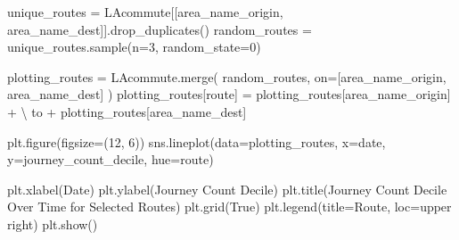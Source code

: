 \documentclass[
  number]{elsarticle}
\newenvironment{Shaded}{\begin{snugshade}}{\end{snugshade}}
\newcommand{\DecValTok}[1]{\textcolor[rgb]{0.68,0.00,0.00}{#1}}
\newcommand{\NormalTok}[1]{\textcolor[rgb]{0.00,0.23,0.31}{#1}}
\newcommand{\OperatorTok}[1]{\textcolor[rgb]{0.37,0.37,0.37}{#1}}
\newcommand{\StringTok}[1]{\textcolor[rgb]{0.13,0.47,0.30}{#1}}
\newcommand{\VariableTok}[1]{\textcolor[rgb]{0.07,0.07,0.07}{#1}}
\begin{document}
\begin{Shaded}
\begin{Highlighting}[]
\NormalTok{unique\_routes }\OperatorTok{=}\NormalTok{ LAcommute[[}\StringTok{\textquotesingle{}area\_name\_origin\textquotesingle{}}\NormalTok{,}
                           \StringTok{\textquotesingle{}area\_name\_dest\textquotesingle{}}\NormalTok{]].drop\_duplicates()}
\NormalTok{random\_routes }\OperatorTok{=}\NormalTok{ unique\_routes.sample(n}\OperatorTok{=}\DecValTok{3}\NormalTok{, random\_state}\OperatorTok{=}\DecValTok{0}\NormalTok{)}

\NormalTok{plotting\_routes }\OperatorTok{=}\NormalTok{ LAcommute.merge(}
\NormalTok{    random\_routes,}
\NormalTok{    on}\OperatorTok{=}\NormalTok{[}\StringTok{\textquotesingle{}area\_name\_origin\textquotesingle{}}\NormalTok{, }\StringTok{\textquotesingle{}area\_name\_dest\textquotesingle{}}\NormalTok{]}
\NormalTok{)}
\NormalTok{plotting\_routes[}\StringTok{\textquotesingle{}route\textquotesingle{}}\NormalTok{] }\OperatorTok{=}\NormalTok{ plotting\_routes[}\StringTok{\textquotesingle{}area\_name\_origin\textquotesingle{}}\NormalTok{] }\OperatorTok{+} \OperatorTok{\textbackslash{}}
    \StringTok{\textquotesingle{} to \textquotesingle{}} \OperatorTok{+}\NormalTok{ plotting\_routes[}\StringTok{\textquotesingle{}area\_name\_dest\textquotesingle{}}\NormalTok{]}

\NormalTok{plt.figure(figsize}\OperatorTok{=}\NormalTok{(}\DecValTok{12}\NormalTok{, }\DecValTok{6}\NormalTok{))}
\NormalTok{sns.lineplot(data}\OperatorTok{=}\NormalTok{plotting\_routes, x}\OperatorTok{=}\StringTok{\textquotesingle{}date\textquotesingle{}}\NormalTok{, y}\OperatorTok{=}\StringTok{\textquotesingle{}journey\_count\_decile\textquotesingle{}}\NormalTok{, hue}\OperatorTok{=}\StringTok{\textquotesingle{}route\textquotesingle{}}\NormalTok{)}

\NormalTok{plt.xlabel(}\StringTok{\textquotesingle{}Date\textquotesingle{}}\NormalTok{)}
\NormalTok{plt.ylabel(}\StringTok{\textquotesingle{}Journey Count Decile\textquotesingle{}}\NormalTok{)}
\NormalTok{plt.title(}\StringTok{\textquotesingle{}Journey Count Decile Over Time for Selected Routes\textquotesingle{}}\NormalTok{)}
\NormalTok{plt.grid(}\VariableTok{True}\NormalTok{)}
\NormalTok{plt.legend(title}\OperatorTok{=}\StringTok{\textquotesingle{}Route\textquotesingle{}}\NormalTok{, loc}\OperatorTok{=}\StringTok{\textquotesingle{}upper right\textquotesingle{}}\NormalTok{)}
\NormalTok{plt.show()}
\end{Highlighting}
\end{Shaded}
\end{document}
